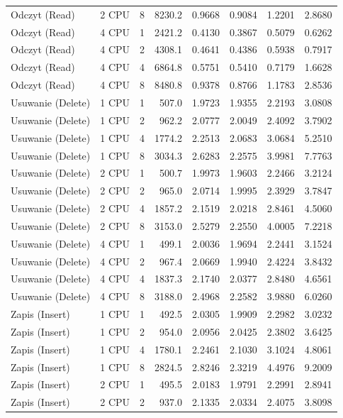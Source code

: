 \begin{table}[ht]
{\begin{tabular}{llcrrrrr}
Odczyt (Read) & 2 CPU & 8 & 8230.2 & 0.9668 & 0.9084 & 1.2201 & 2.8680 \\
Odczyt (Read) & 4 CPU & 1 & 2421.2 & 0.4130 & 0.3867 & 0.5079 & 0.6262 \\
Odczyt (Read) & 4 CPU & 2 & 4308.1 & 0.4641 & 0.4386 & 0.5938 & 0.7917 \\
Odczyt (Read) & 4 CPU & 4 & 6864.8 & 0.5751 & 0.5410 & 0.7179 & 1.6628 \\
Odczyt (Read) & 4 CPU & 8 & 8480.8 & 0.9378 & 0.8766 & 1.1783 & 2.8536 \\
Usuwanie (Delete) & 1 CPU & 1 & 507.0 & 1.9723 & 1.9355 & 2.2193 & 3.0808 \\
Usuwanie (Delete) & 1 CPU & 2 & 962.2 & 2.0777 & 2.0049 & 2.4092 & 3.7902 \\
Usuwanie (Delete) & 1 CPU & 4 & 1774.2 & 2.2513 & 2.0683 & 3.0684 & 5.2510 \\
Usuwanie (Delete) & 1 CPU & 8 & 3034.3 & 2.6283 & 2.2575 & 3.9981 & 7.7763 \\
Usuwanie (Delete) & 2 CPU & 1 & 500.7 & 1.9973 & 1.9603 & 2.2466 & 3.2124 \\
Usuwanie (Delete) & 2 CPU & 2 & 965.0 & 2.0714 & 1.9995 & 2.3929 & 3.7847 \\
Usuwanie (Delete) & 2 CPU & 4 & 1857.2 & 2.1519 & 2.0218 & 2.8461 & 4.5060 \\
Usuwanie (Delete) & 2 CPU & 8 & 3153.0 & 2.5279 & 2.2550 & 4.0005 & 7.2218 \\
Usuwanie (Delete) & 4 CPU & 1 & 499.1 & 2.0036 & 1.9694 & 2.2441 & 3.1524 \\
Usuwanie (Delete) & 4 CPU & 2 & 967.4 & 2.0669 & 1.9940 & 2.4224 & 3.8432 \\
Usuwanie (Delete) & 4 CPU & 4 & 1837.3 & 2.1740 & 2.0377 & 2.8480 & 4.6561 \\
Usuwanie (Delete) & 4 CPU & 8 & 3188.0 & 2.4968 & 2.2582 & 3.9880 & 6.0260 \\
Zapis (Insert) & 1 CPU & 1 & 492.5 & 2.0305 & 1.9909 & 2.2982 & 3.0232 \\
Zapis (Insert) & 1 CPU & 2 & 954.0 & 2.0956 & 2.0425 & 2.3802 & 3.6425 \\
Zapis (Insert) & 1 CPU & 4 & 1780.1 & 2.2461 & 2.1030 & 3.1024 & 4.8061 \\
Zapis (Insert) & 1 CPU & 8 & 2824.5 & 2.8246 & 2.3219 & 4.4976 & 9.2009 \\
Zapis (Insert) & 2 CPU & 1 & 495.5 & 2.0183 & 1.9791 & 2.2991 & 2.8941 \\
Zapis (Insert) & 2 CPU & 2 & 937.0 & 2.1335 & 2.0334 & 2.4075 & 3.8098 \\

\end{tabular}}
\end{table}

